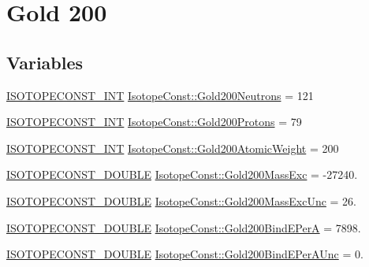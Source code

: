 \hypertarget{group___isotope_const-_gold-_au200}{}\section{Gold 200}
\label{group___isotope_const-_gold-_au200}
\subsection*{Variables}
\begin{DoxyCompactItemize}
\item 
\mbox{\hyperlink{group___isotope_const-_macros_ga5f18360b3e99483a35c32d789e62621c}{I\+S\+O\+T\+O\+P\+E\+C\+O\+N\+S\+T\+\_\+\+I\+NT}} \mbox{\hyperlink{group___isotope_const-_gold-_au200_gada5484c7867bce52716044fd46aef24e}{Isotope\+Const\+::\+Gold200\+Neutrons}} = 121
\item 
\mbox{\hyperlink{group___isotope_const-_macros_ga5f18360b3e99483a35c32d789e62621c}{I\+S\+O\+T\+O\+P\+E\+C\+O\+N\+S\+T\+\_\+\+I\+NT}} \mbox{\hyperlink{group___isotope_const-_gold-_au200_gac75fe60394af9085c8bb431e32994f24}{Isotope\+Const\+::\+Gold200\+Protons}} = 79
\item 
\mbox{\hyperlink{group___isotope_const-_macros_ga5f18360b3e99483a35c32d789e62621c}{I\+S\+O\+T\+O\+P\+E\+C\+O\+N\+S\+T\+\_\+\+I\+NT}} \mbox{\hyperlink{group___isotope_const-_gold-_au200_ga28819ddcf685d851774f1aa3e8e4b64c}{Isotope\+Const\+::\+Gold200\+Atomic\+Weight}} = 200
\item 
\mbox{\hyperlink{group___isotope_const-_macros_ga8f45a7272ce02c0b4c65c44636ed719a}{I\+S\+O\+T\+O\+P\+E\+C\+O\+N\+S\+T\+\_\+\+D\+O\+U\+B\+LE}} \mbox{\hyperlink{group___isotope_const-_gold-_au200_ga2ac535f059a623abb0d106f410b8504d}{Isotope\+Const\+::\+Gold200\+Mass\+Exc}} = -\/27240.
\item 
\mbox{\hyperlink{group___isotope_const-_macros_ga8f45a7272ce02c0b4c65c44636ed719a}{I\+S\+O\+T\+O\+P\+E\+C\+O\+N\+S\+T\+\_\+\+D\+O\+U\+B\+LE}} \mbox{\hyperlink{group___isotope_const-_gold-_au200_ga7cebd77a438abde3d6ac5a65a2f662ab}{Isotope\+Const\+::\+Gold200\+Mass\+Exc\+Unc}} = 26.
\item 
\mbox{\hyperlink{group___isotope_const-_macros_ga8f45a7272ce02c0b4c65c44636ed719a}{I\+S\+O\+T\+O\+P\+E\+C\+O\+N\+S\+T\+\_\+\+D\+O\+U\+B\+LE}} \mbox{\hyperlink{group___isotope_const-_gold-_au200_ga0db644415e9a8e62e678acb56206d6d7}{Isotope\+Const\+::\+Gold200\+Bind\+E\+PerA}} = 7898.
\item 
\mbox{\hyperlink{group___isotope_const-_macros_ga8f45a7272ce02c0b4c65c44636ed719a}{I\+S\+O\+T\+O\+P\+E\+C\+O\+N\+S\+T\+\_\+\+D\+O\+U\+B\+LE}} \mbox{\hyperlink{group___isotope_const-_gold-_au200_ga5f09091a478cc40e5ea5c75c29f03906}{Isotope\+Const\+::\+Gold200\+Bind\+E\+Per\+A\+Unc}} = 0.

\end{DoxyCompactItemize}
